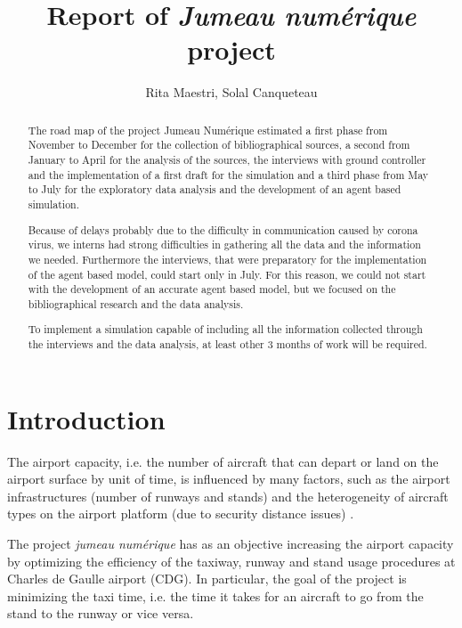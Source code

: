 \documentclass{article}
\begin{document}
	
	\title{Report of \textit{Jumeau numérique} project}
	\author{Rita Maestri, Solal Canqueteau}
	\maketitle
	
\newpage
\begin{abstract}
	The road map of the project Jumeau Numérique estimated a first phase from November to December for the collection of bibliographical sources, a second from January to April for the analysis of the sources, the interviews with ground controller and the implementation of a first draft for the simulation and a third phase from May to July for the exploratory data analysis and the development of an agent based simulation. 
	
	Because of delays probably due to the difficulty in communication caused by corona virus, we interns had strong difficulties in gathering all the data and the information we needed. Furthermore the interviews, that were preparatory for the implementation of the agent based model, could start only in July. 
	For this reason, we could not start with the development of an accurate agent based model, but we focused on the bibliographical research and the data analysis.
	
	To implement a simulation capable of including all the information collected through the interviews and the data analysis, at least other 3 months of work will be required.
\end{abstract}

\tableofcontents
\newpage

	
\part{Introduction}

The airport capacity, i.e. the number of aircraft that can depart or land on the airport surface by unit of time, is influenced by many factors, such as the airport infrastructures (number of runways and stands) and the heterogeneity of aircraft types on the airport platform (due to security distance issues) \cite{gotteland}.

The project \textit{jumeau numérique} has as an objective increasing the airport capacity by optimizing the efficiency of the taxiway, runway and stand usage procedures at Charles de Gaulle airport (CDG). In particular, the goal of the project is minimizing the taxi time, i.e. the time it takes for an aircraft to go from the stand to the runway or vice versa.
\end{document}
